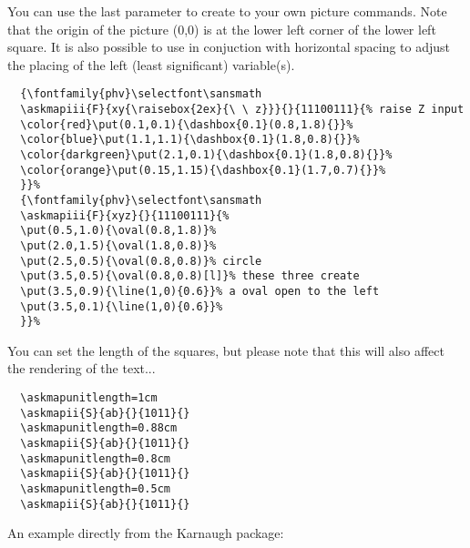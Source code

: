 \documentclass[a4paper,10pt]{ltxdoc}
\begin{document}
You can use the last parameter to create to your own picture commands. Note
that the origin of the picture (0,0) is at the lower left corner of the lower
left square. It is also possible to use  in conjuction with
horizontal spacing to adjust the placing of the left (least significant)
variable(s).
\begin{verbatim}
  {\fontfamily{phv}\selectfont\sansmath
  \askmapiii{F}{xy{\raisebox{2ex}{\ \ z}}}{}{11100111}{% raise Z input
  \color{red}\put(0.1,0.1){\dashbox{0.1}(0.8,1.8){}}%
  \color{blue}\put(1.1,1.1){\dashbox{0.1}(1.8,0.8){}}%
  \color{darkgreen}\put(2.1,0.1){\dashbox{0.1}(1.8,0.8){}}%
  \color{orange}\put(0.15,1.15){\dashbox{0.1}(1.7,0.7){}}%
  }}%
  {\fontfamily{phv}\selectfont\sansmath
  \askmapiii{F}{xyz}{}{11100111}{%
  \put(0.5,1.0){\oval(0.8,1.8)}%
  \put(2.0,1.5){\oval(1.8,0.8)}%
  \put(2.5,0.5){\oval(0.8,0.8)}% circle
  \put(3.5,0.5){\oval(0.8,0.8)[l]}% these three create
  \put(3.5,0.9){\line(1,0){0.6}}% a oval open to the left
  \put(3.5,0.1){\line(1,0){0.6}}%
  }}%
\end{verbatim}
{\selectfont\sansmath
{}}%
{\selectfont\sansmath
{}}%
\bigskip\bigskip

You can set the length of the squares, but please note that this will also
affect the rendering of the text...
\begin{verbatim}
  \askmapunitlength=1cm
  \askmapii{S}{ab}{}{1011}{}
  \askmapunitlength=0.88cm
  \askmapii{S}{ab}{}{1011}{}
  \askmapunitlength=0.8cm
  \askmapii{S}{ab}{}{1011}{}
  \askmapunitlength=0.5cm
  \askmapii{S}{ab}{}{1011}{}
\end{verbatim}

{\askmapunitlength=1cm
\askmapunitlength=0.88cm
\askmapunitlength=0.8cm
\askmapunitlength=0.5cm
}
\bigskip\bigskip

An example directly from the Karnaugh package:
\end{document}

